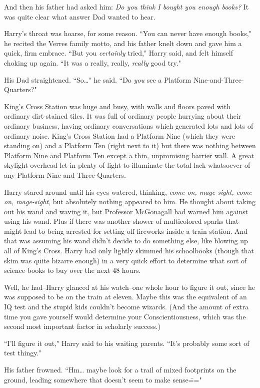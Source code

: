 And then his father had asked him: \emph{Do you think I bought you enough books?} It was quite clear what answer Dad wanted to hear.

Harry's throat was hoarse, for some reason. ``You can never have enough books," he recited the Verres family motto, and his father knelt down and gave him a quick, firm embrace. ``But you \emph{certainly} tried," Harry said, and felt himself choking up again. ``It was a really, really, \emph{really} good try."

His Dad straightened. ``So{\ldots}" he said. ``Do \emph{you} see a Platform Nine-and-Three-Quarters?"

King's Cross Station was huge and busy, with walls and floors paved with ordinary dirt-stained tiles. It was full of ordinary people hurrying about their ordinary business, having ordinary conversations which generated lots and lots of ordinary noise. King's Cross Station had a Platform Nine (which they were standing on) and a Platform Ten (right next to it) but there was nothing between Platform Nine and Platform Ten except a thin, unpromising barrier wall. A great skylight overhead let in plenty of light to illuminate the total lack whatsoever of any Platform Nine-and-Three-Quarters.

Harry stared around until his eyes watered, thinking, \emph{come on, mage-sight, come on, mage-sight}, but absolutely nothing appeared to him. He thought about taking out his wand and waving it, but Professor McGonagall had warned him against using his wand. Plus if there was another shower of multicolored sparks that might lead to being arrested for setting off fireworks inside a train station. And that was assuming his wand didn't decide to do something else, like blowing up all of King's Cross. Harry had only lightly skimmed his schoolbooks (though that skim was quite bizarre enough) in a very quick effort to determine what sort of science books to buy over the next 48 hours.

Well, he had\---Harry glanced at his watch\---one whole hour to figure it out, since he was supposed to be on the train at eleven. Maybe this was the equivalent of an IQ test and the stupid kids couldn't become wizards. (And the amount of extra time you gave yourself would determine your Conscientiousness, which was the second most important factor in scholarly success.)

``I'll figure it out," Harry said to his waiting parents. ``It's probably some sort of test thingy."

His father frowned. ``Hm{\ldots} maybe look for a trail of mixed footprints on the ground, leading somewhere that doesn't seem to make sense\==="

